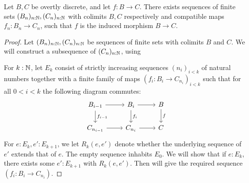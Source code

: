\begin{lemma}\label{lemDecompositionOfColimitMorphisms}
  Let $B,C$ be overtly discrete, 
  and let $f:B\to C$.
  There exists sequences of finite sets 
  $(B_n)_{n:\mathbb{N}}, (C_n)_{n:\mathbb{N}}$ with colimits $B,C$ respectively
  and compatible maps $f_n:B_n \to C_n$, 
  such that $f$ is the induced morphism $B\to C$.
\end{lemma}
\begin{proof}
  Let $(B_n)_{n:\mathbb{N}}, (C_n)_{n:\mathbb{N}}$ be 
  sequences of finite sets with colimits $B$ and $C$. 
  We will construct a subsequence of $(C_n)_{n:\mathbb{N}}$, using 

  For $k:\mathbb{N}$, let $E_k$ consist of 
  strictly increasing sequences $(n_i)_{i<k}$ of natural numbers together with a finite family of maps 
  $(f_i: B_{i} \to C_{n_i})_{i<k}$ such that
  for all $0<i<k$ the following diagram commutes:
  \begin{equation}\label{eqnDecompositionOfColimitMorphisms}
    \begin{tikzcd}
      B_{i-1} \arrow[r] \arrow[d, "f_{i-1}"]& B_{{i}} \arrow[r] \arrow[d,"f_{i}"]& B \arrow[d,"f"] \\
      C_{n_{i-1}} \arrow[r] & C_{n_{i}} \arrow[r] & C 
    \end{tikzcd}
  \end{equation}
  For $e:E_k, e':E_{k+1}$, we let 
  $R_k(e,e')$ denote  whether the underlying sequence of $e'$ extends that of $e$. 
  The empty sequence inhabits $E_0$. We will show that if $e:E_k$, there exists some $e':E_{k+1}$ with 
  $R_k(e,e')$. Then  will give the required sequence $(f_i:B_i\to C_{n_i})$.


\end{proof}
